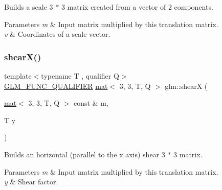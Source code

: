 Builds a scale 3 $\ast$ 3 matrix created from a vector of 2 components.


\begin{DoxyParams}{Parameters}
{\em m} & Input matrix multiplied by this translation matrix. \\
\hline
{\em v} & Coordinates of a scale vector. \\
\hline
\end{DoxyParams}
\mbox{\label{group__gtx__matrix__transform__2d_gab0c6659f6895e2536aed6c893d70aa74}} 
\subsubsection{\texorpdfstring{shear\+X()}{shearX()}}
{\footnotesize\ttfamily template$<$typename T , qualifier Q$>$ \\
\mbox{\hyperlink{setup_8hpp_a33fdea6f91c5f834105f7415e2a64407}{G\+L\+M\+\_\+\+F\+U\+N\+C\+\_\+\+Q\+U\+A\+L\+I\+F\+I\+ER}} \mbox{\hyperlink{structglm_1_1mat}{mat}}$<$ 3, 3, T, Q $>$ glm\+::shearX (\begin{DoxyParamCaption}\item[{\mbox{\hyperlink{structglm_1_1mat}{mat}}$<$ 3, 3, T, Q $>$ const \&}]{m,  }\item[{T}]{y }\end{DoxyParamCaption})}

Builds an horizontal (parallel to the x axis) shear 3 $\ast$ 3 matrix.


\begin{DoxyParams}{Parameters}
{\em m} & Input matrix multiplied by this translation matrix. \\
\hline
{\em y} & Shear factor. \\
\hline
\end{DoxyParams}
\mbox{\label{group__gtx__matrix__transform__2d_ga2587e46b06a9801aba9ded45cc73445b}} 
